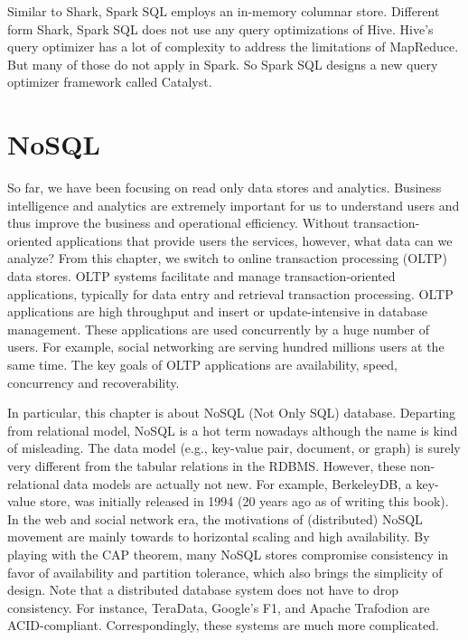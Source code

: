 \documentclass[11pt]{book}
\begin{document}
Similar to Shark, Spark SQL employs an in-memory columnar store. Different form Shark, Spark SQL does not use any query optimizations of Hive. Hive's query optimizer has a lot of complexity to address the limitations of MapReduce. But many of those do not apply in Spark. So Spark SQL designs a new query optimizer framework called Catalyst.

\chapter[NoSQL]
{NoSQL}
So far, we have been focusing on read only data stores and analytics. Business intelligence and analytics are extremely important for us to understand users and thus improve the business and operational efficiency. Without transaction-oriented applications that provide users the services, however, what data can we analyze? From this chapter, we switch to online transaction processing (OLTP) data stores. OLTP systems facilitate and manage transaction-oriented applications, typically for data entry and retrieval transaction processing. OLTP applications are high throughput and insert or update-intensive in database management. These applications are used concurrently by a huge number of users. For example, social networking are serving hundred millions users at the same time. The key goals of OLTP applications are availability, speed, concurrency and recoverability.

In particular, this chapter is about NoSQL (Not Only SQL) database. Departing from relational model,  NoSQL is a hot term nowadays although the name is kind of misleading. The data model (e.g., key-value pair, document, or graph) is surely very different from the tabular relations in the RDBMS. However, these non-relational data models are actually not new. For example, BerkeleyDB, a key-value store, was initially released in 1994 (20 years ago as of writing this book). In the web and social network era, the motivations of (distributed) NoSQL movement are mainly towards to horizontal scaling and high availability. By playing with the CAP theorem, many NoSQL stores compromise consistency in favor of availability and partition tolerance, which also brings the simplicity of design. Note that a distributed database system does not have to drop consistency. For instance, TeraData, Google's F1, and Apache Trafodion are ACID-compliant. Correspondingly, these systems are much more complicated.
\end{document}

